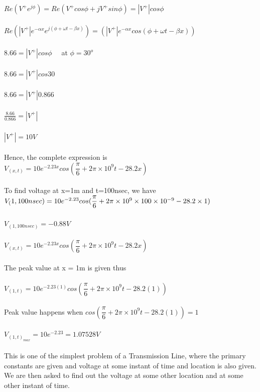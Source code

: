 $Re({V^{+}e^{j\phi}}) = Re({V^{+}{cos\phi}} + {jV^{+}{sin\phi}}) = |V^{+}|{cos\phi}$\\\\
$Re({|V^{+}|e^{-\alpha x}e^{j(\phi+\omega t - \beta x)}}) = ({|V^{+}|e^{-\alpha x}cos{(\phi+\omega t - \beta x)}})$\\\\
$8.66 = {|V^+|{cos\phi}} \quad$ at $ \phi = 30^{o} $\\\\
$8.66 = {|V^+|{cos30}}$\\\\
$8.66 = {|V^+|{0.866}}$\\\\
$\frac{8.66}{0.866} = {|V^+|}$\\\\
${|V^{+}| = 10V}$\\\\
Hence, the complete expression is\\
$V_({x,t}) = 10e^{-2.23x} cos({\dfrac{\pi}{6} + 2\pi\times10^9t - 28.2x})$\\\\
To find voltage at x=1m and t=100nsec, we have\\
$V_({1,100nsec}) \\ = 10e^{-2.23} cos({\dfrac{\pi}{6} + 2\pi\times10^9\times100\times10^{-9} - 28.2\times1})$\\\\
$V_({1,100nsec}) = -0.88V$\\\\
$V_({x,t}) = 10e^{-2.23x} cos({\dfrac{\pi}{6} + 2\pi\times10^9t - 28.2x})$\\\\
The peak value at x = 1m is given thus\\\\
$V_({1,t}) = 10e^{-2.23(1)} cos({\dfrac{\pi}{6} + 2\pi\times10^9t - 28.2(1)})$\\\\
Peak value happens when $cos({\dfrac{\pi}{6} + 2\pi\times10^9t - 28.2(1)}) = 1$\\\\
$ V_{(1,t)_{max}} = 10e^{-2.23} = 1.07528V $\\\\
This is one of the simplest problem of a Transmission Line, where the primary constants are given and voltage at some instant of time and location is also given. We are then asked to find out the voltage at some other location and at some other instant of time.\\
